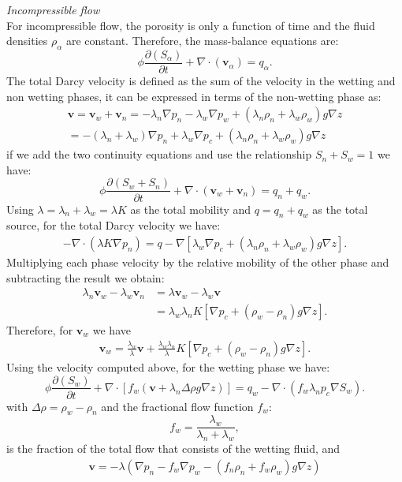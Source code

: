 \documentclass[a4paper,10pt]{report}
\begin{document}
\emph{Incompressible flow}\\
For incompressible flow, the porosity is only a function of time and the fluid densities $\rho_{\alpha}$ are constant. Therefore, the mass-balance equations are:
\begin{equation}
 \phi\frac{\partial( {S}_{\alpha})}{\partial t}+\nabla \cdot ( \mathbf{v}_{\alpha})= q_{\alpha}.
\end{equation}
The total Darcy velocity is defined as the sum of the velocity in the wetting and non wetting phases, it can be expressed in terms of the non-wetting phase as:
\begin{align*}
\mathbf{v}=\mathbf{v}_w+\mathbf{v}_n=-\lambda_{n}\nabla p_n-\lambda_{w}\nabla p_w+(\lambda_n \rho_n+\lambda_w\rho_w)g\nabla z\\
=-(\lambda_n+\lambda_w)\nabla p_n+\lambda_w\nabla p_c+(\lambda_n \rho_n+\lambda_w\rho_w)g\nabla z
\end{align*}
if we add the two continuity equations and use the relationship $S_n+S_w=1$ we have:
\begin{equation*}
 \phi\frac{\partial( {S}_{w}+S_n)}{\partial t}+\nabla \cdot ( \mathbf{v}_{w}+\mathbf{v}_n)= q_{n}+q_w.
\end{equation*}
Using $\lambda=\lambda_n+\lambda_w=\lambda K$ as the total mobility and $q=q_n+q_w$ as the total source, for the total Darcy velocity we have:
\begin{align*}
-\nabla \cdot (\lambda K\nabla p_n)=q-\nabla[\lambda_w\nabla p_c+(\lambda_n\rho_n+\lambda_w\rho_w)g\nabla z].
\end{align*}
Multiplying each phase velocity by the relative mobility of the other phase and subtracting the result we obtain:
\begin{align*}
\lambda_n\mathbf{v}_w-\lambda_w\mathbf{v}_n&=\lambda\mathbf{v}_w-\lambda_w\mathbf{v}\\
&=\lambda_w\lambda_n K[\nabla p_c+(\rho_w-\rho_n)g\nabla z].
\end{align*}
Therefore, for $\mathbf{v}_w$ we have
\begin{align*}
\mathbf{v}_w=\frac{\lambda_w}{\lambda}\mathbf{v}+\frac{\lambda_w\lambda_n}{\lambda} K[\nabla p_c+(\rho_w-\rho_n)g\nabla z].
\end{align*}
Using the velocity computed above, for the wetting phase we have:
\begin{equation}\label{eq:sat}
 \phi\frac{\partial( {S}_{w})}{\partial t}+\nabla \cdot [f_w( \mathbf{v}+\lambda_n\Delta  \rho g\nabla z)]= q_w-\nabla \cdot(f_w\lambda_np_c\nabla S_w).
\end{equation}
with $\Delta \rho= \rho_w-\rho_n$ and the fractional flow function $f_w$:
$$f_w=\frac{\lambda_{w}}{\lambda_n+\lambda_w},$$
is the fraction of the total flow that consists of the wetting fluid, and
\begin{align*}
\mathbf{v}=-\lambda(\nabla p_n-f_w\nabla p_w-(f_n \rho_n+f_w\rho_w)g\nabla z)\\
\end{align*}
\end{document}
